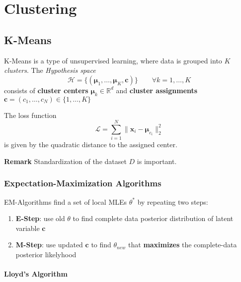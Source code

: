 \section{Clustering}

\subsection{K-Means}
K-Means is a type of unsupervised learning, where data is grouped into $K$ \textit{clusters}.
The \textit{Hypothesis space}
\noindent\begin{equation*}
    \mathcal{H} = \{(\boldsymbol{\mu}_1,\ldots,\boldsymbol{\mu}_K,\mathbf{c})\}\qquad \forall k=1,\ldots, K
\end{equation*}
consists of \textbf{cluster centers} $\boldsymbol{\mu}_k\in \mathbb{R}^d$ and \textbf{cluster assignments} $\mathbf{c} = (c_1,\ldots,c_N)\in\{1,\ldots, K\}$

\newpar{}
The loss function
\noindent\begin{equation*}
    \mathcal{L}=\sum_{i=1}^{N} \|\mathbf{x}_i-\boldsymbol{\mu}_{c_i} \|_2^2
\end{equation*}
is given by the quadratic distance to the assigned center.

\textbf{Remark}
Standardization of the dataset $D$ is important.

\subsubsection{Expectation-Maximization Algorithms}
EM-Algorithms find a set of local MLEs $\theta^*$ by repeating two steps:
\begin{enumerate}
    \item \textbf{E-Step}: use old $\theta$ to find complete data posterior distribution of latent variable $\mathbf{c}$
    \item \textbf{M-Step}: use updated $\mathbf{c}$ to find $\theta_{new}$ that \textbf{maximizes} the complete-data posterior likelyhood
\end{enumerate}

\paragraph{Lloyd's Algorithm}

